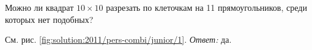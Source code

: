 Можно ли квадрат $10 \times 10$ разрезать по клеточкам на 11 прямоугольников,
среди которых нет подобных?

%
\label{solution:2011/pers-combi/junior/1}%
См. рис. \ref{fig:solution:2011/pers-combi/junior/1}.
\emph{Ответ:}
да.

